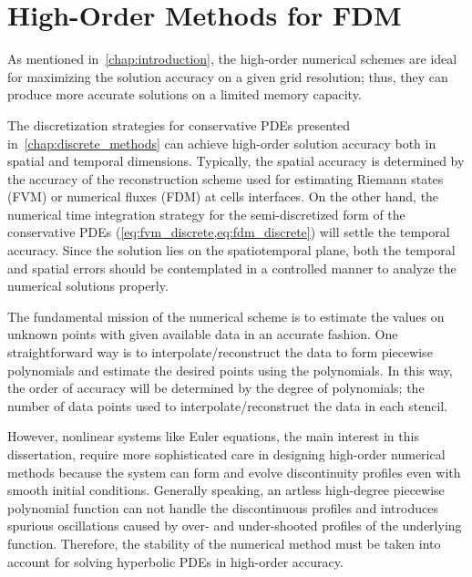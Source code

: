 \chapter{High-Order Methods for FDM}\label{chap:high_order_methods}

As mentioned in~\cref{chap:introduction}, the high-order numerical schemes are ideal
for maximizing the solution accuracy on a given grid resolution;
thus, they can produce more accurate solutions on a limited memory capacity.

The discretization strategies for conservative PDEs presented in~\cref{chap:discrete_methods}
can achieve high-order solution accuracy both in spatial and temporal dimensions.
Typically, the spatial accuracy is determined by the accuracy of the reconstruction scheme
used for estimating Riemann states (FVM) or numerical fluxes (FDM) at cells interfaces.
On the other hand, the numerical time integration strategy for the semi-discretized form
of the conservative PDEs (\cref{eq:fvm_discrete,eq:fdm_discrete}) will settle the temporal accuracy.
Since the solution lies on the spatiotemporal plane,
both the temporal and spatial errors should be contemplated in a controlled manner
to analyze the numerical solutions properly.

The fundamental mission of the numerical scheme is to estimate the values on unknown points
with given available data in an accurate fashion. One straightforward way is to interpolate/reconstruct
the data to form piecewise polynomials and estimate the desired points using the polynomials.
In this way, the order of accuracy will be determined by the degree of polynomials;
the number of data points used to interpolate/reconstruct the data in each stencil.

However, nonlinear systems like Euler equations, the main interest in this dissertation,
require more sophisticated care in designing high-order numerical methods
because the system can form and evolve discontinuity profiles even with smooth initial conditions.
Generally speaking, an artless high-degree piecewise polynomial function
can not handle the discontinuous profiles and introduces spurious oscillations
caused by over- and under-shooted profiles of the underlying function.
Therefore, the stability of the numerical method must be taken into account
for solving hyperbolic PDEs in high-order accuracy.

